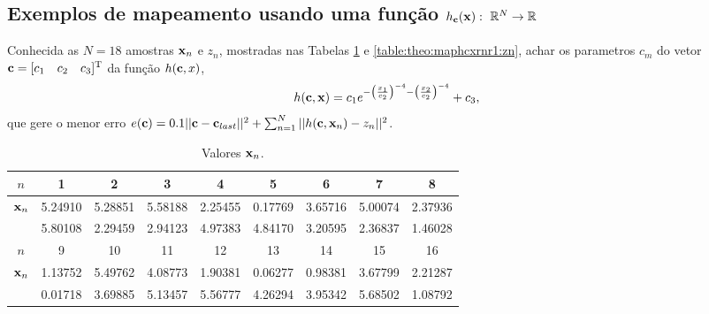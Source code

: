 
\subsection{Exemplos de mapeamento usando uma função
$h_{\VECTOR{c}}(\VECTOR{x}):~\mathbb{R}^N \rightarrow \mathbb{R}$}

\begin{example}\label{ex:theo:maphcxrnr1}
Conhecida as $N=18$ amostras $\VECTOR{x}_n$ e $z_n$, mostradas nas  Tabelas \ref{table:theo:maphcxrnr1:xn} e \ref{table:theo:maphcxrnr1:zn},
achar os parametros $c_m$ do vetor $\VECTOR{c}=[c_1\quad c_2\quad c_3]^{\transpose}$ da função $h(\VECTOR{c},x)$, 
\begin{equation}
h(\VECTOR{c},\VECTOR{x})=c_1 e^{-\left(\frac{x_1}{c_2}\right)^{-4}-\left(\frac{x_2}{c_2}\right)^{-4}}+c_3,
\end{equation}
que gere o menor erro 
$e(\VECTOR{c})=0.1 ||\VECTOR{c}-\VECTOR{c}_{last}||^2 + \sum_{n=1}^{N} ||h(\VECTOR{c},\VECTOR{x}_n)-z_n||^2 $.
\end{example}


\begin{table}[h!]
\centering
\begin{tabular}{|c|c|c|c|c|c|c|c|c|} 
 \hline
$n$   & 1 & 2 & 3 & 4 & 5 & 6 & 7 & 8\\ \hline
$\VECTOR{x}_n$ & 5.24910 & 5.28851 & 5.58188 & 2.25455 & 0.17769 & 3.65716 & 5.00074 & 2.37936 \\ 
             ~ & 5.80108 & 2.29459 & 2.94123 & 4.97383 & 4.84170 & 3.20595 & 2.36837 & 1.46028 \\ \hline
 \hline
$n$   & 9 & 10 & 11 & 12 & 13 & 14 & 15 & 16\\  \hline
$\VECTOR{x}_n$ & 1.13752 & 5.49762 & 4.08773 & 1.90381 & 0.06277 & 0.98381 & 3.67799 & 2.21287 \\
             ~ & 0.01718 & 3.69885 & 5.13457 & 5.56777 & 4.26294 & 3.95342 & 5.68502 & 1.08792 \\ \hline
\end{tabular}
\caption{Valores $\VECTOR{x}_n$.}
\label{table:theo:maphcxrnr1:xn}
\end{table}

